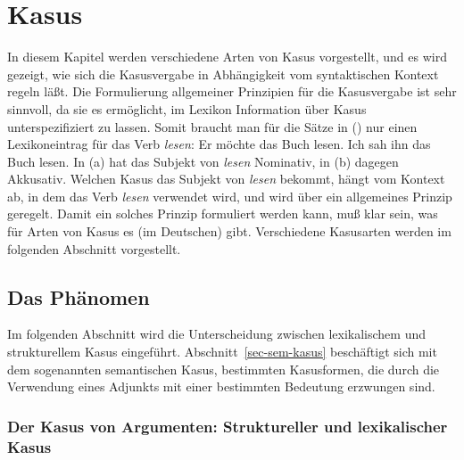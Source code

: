 


\chapter{Kasus}
\label{chap-kasus}

In diesem Kapitel werden verschiedene Arten von Kasus vorgestellt, und es wird gezeigt,
wie sich die Kasusvergabe in Abhängigkeit vom syntaktischen Kontext regeln läßt.
Die Formulierung allgemeiner Prinzipien für die Kasusvergabe ist sehr sinnvoll,
da sie es ermöglicht, im Lexikon Information über Kasus unterspezifiziert zu lassen.
Somit braucht man für die Sätze in () nur einen Lexikoneintrag für das Verb \emph{lesen}:
\eal
\ex Er möchte das Buch lesen.
\ex Ich sah ihn das Buch lesen.
\zl
In (a) hat das Subjekt von \emph{lesen} Nominativ, in (b) dagegen Akkusativ.
Welchen Kasus das Subjekt von \emph{lesen} bekommt, hängt vom Kontext ab, in dem das
Verb \emph{lesen} verwendet wird, und wird über ein allgemeines Prinzip geregelt. Damit
ein solches Prinzip formuliert werden kann, muß klar sein, was für Arten von Kasus es
(im Deutschen) gibt. Verschiedene Kasusarten werden im folgenden Abschnitt vorgestellt.

\section{Das Phänomen}

Im folgenden Abschnitt wird die Unterscheidung zwischen lexikalischem und strukturellem
Kasus eingeführt. Abschnitt~\ref{sec-sem-kasus} beschäftigt sich mit dem sogenannten
semantischen Kasus, bestimmten Kasusformen, die durch die Verwendung eines Adjunkts
mit einer bestimmten Bedeutung erzwungen sind. 

\subsection{Der Kasus von Argumenten: Struktureller und lexikalischer Kasus}
\label{sec-struk-lex-kas}
\label{sec-struc-lex-kas}
%

